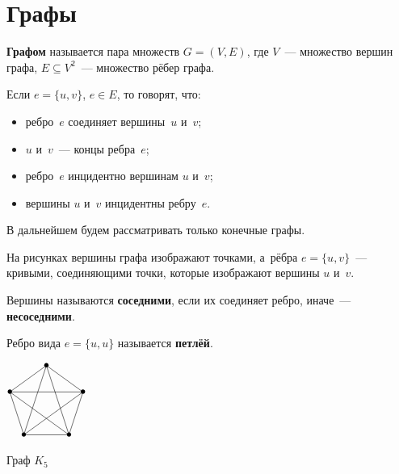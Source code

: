 \section{Графы}
\begin{definition}
	\textbf{Графом} называется пара множеств $G = (V, E)$, где $V$~--- множество вершин графа, $E \subseteq V^2$~--- множество рёбер графа.
	
	Если $e = \{ u, v \}$, $e \in E$, то говорят, что:
\begin{itemize}
	\item ребро~$e$ соединяет вершины~$u$ и~$v$;
	\item $u$ и~$v$~--- концы ребра~$e$;
	\item ребро~$e$ инцидентно вершинам $u$ и~$v$;
	\item вершины $u$ и~$v$ инцидентны ребру~$e$.
\end{itemize}
\end{definition}

	В дальнейшем будем рассматривать только конечные графы.

	На рисунках вершины графа изображают точками, а~рёбра $e = \{ u, v \}$~--- кривыми, соединяющими точки, которые изображают вершины $u$ и~$v$.
	
\begin{definition}
	Вершины называются \textbf{соседними}, если их соединяет ребро, иначе~--- \textbf{несоседними}.
\end{definition}

\begin{definition}
	Ребро вида $e = \{ u, u \}$ называется \textbf{петлёй}.
\end{definition}

\begin{floatingfigure}{30mm}
\noindent
\begin{center}
$\begin{xy} /r0.4mm/:
	(30, 60) = "1" *{\bullet}; %
	(58.532, 39.271) = "2" *{\bullet}; %
	(47.634, 5.729) = "3" *{\bullet}; %
	(12.366, 5.729) = "4" *{\bullet}; %
	(1.468, 39.271) = "5" *{\bullet}; %
	"5"; "1" **@{-}; "2" **@{-}; "3" **@{-}; "4" **@{-}; "5" **@{-};
	"2" **@{-}; "4" **@{-}; "1" **@{-}; "3" **@{-}; "5" **@{-};
\end{xy}$
\caption{Граф $K_5$}
\end{center}
\end{floatingfigure}
	
